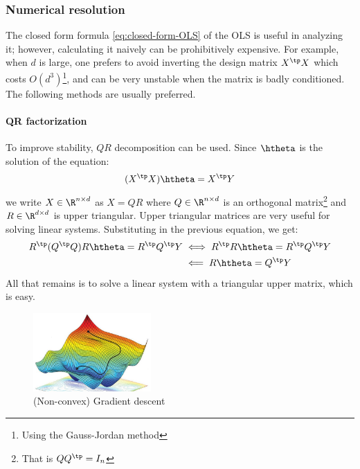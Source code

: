 \documentclass[toc, titlepaged]{../cs-classes/cs-classes}
\begin{document}
\subsubsection{Numerical resolution}
The closed form formula \eqref{eq:closed-form-OLS} of the OLS is useful in analyzing it; however, calculating it naively can be prohibitively expensive. For example, when $d$ is large, one prefers to avoid inverting the design matrix $X^\tp X$ which costs $O(d^3)$\footnote{Using the Gauss-Jordan method}, and can be very unstable when the matrix is badly conditioned. The following methods are usually preferred.

\paragraph*{QR factorization}
To improve stability, $QR$ decomposition can be used. Since $\htheta$ is the solution of the equation:
\begin{equation*}
    (X^\tp X)\htheta = X^\tp Y
\end{equation*}
we write $X\in\R^{n\times d}$ as $X=QR$ where $Q\in\R^{n\times d}$ is an orthogonal matrix\footnote{That is $QQ^\tp=I_n$} and $R\in\R^{d\times d}$ is upper triangular. Upper triangular matrices are very useful for solving linear systems. Substituting in the previous equation, we get:
\begin{equation*}
    \begin{aligned}
        R^\tp(Q^\tp Q)R\htheta = R^\tp Q^\tp Y &\iff R^\tp R\htheta = R^\tp Q^\tp Y \\
        &\impliedby R\htheta = Q^\tp Y
    \end{aligned}
\end{equation*}
All that remains is to solve a linear system with a triangular upper matrix, which is easy.

\begin{figure}
    \centering
    \includegraphics[width=0.4\textwidth]{images/gradient-descent.jpg}
    \caption{(Non-convex) Gradient descent}
\end{figure}
\end{document}
